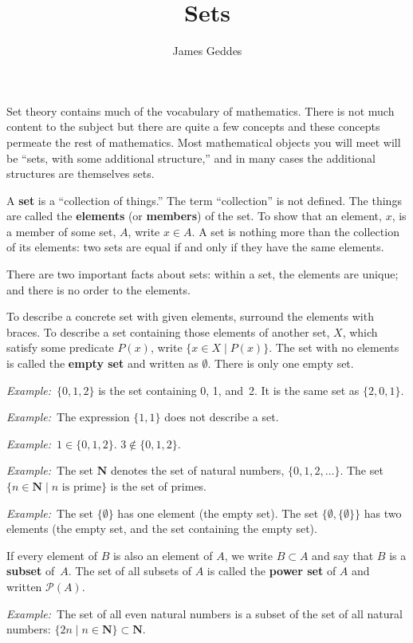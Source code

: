 \documentclass[12pt, a4paper]{article}
\title{\vspace{-6ex}Sets}
\author{James Geddes}
\newcommand{\defn}[1]{\textbf{#1}}
\newcommand{\set}[1]{\mathbold{#1}}
\newcommand{\eg}{\emph{Example:}\relax}
\begin{document}
\maketitle

Set theory contains much of the vocabulary of mathematics. There is
not much content to the subject but there are quite a few concepts and
these concepts permeate the rest of mathematics. Most mathematical
objects you will meet will be “sets, with some additional structure,”
and in many cases the additional structures are themselves sets.

A \defn{set} is a “collection of things.” The term “collection” is not
defined. The things are called the \defn{elements} (or \defn{members})
of the set. To show that an element, $x$, is a member of some set,
$A$, write $x \in A$. A set is nothing more than the collection of its
elements: two sets are equal if and only if they have the same elements.

There are two important facts about sets: within a set, the elements
are unique; and there is no order to the elements.

To describe a concrete set with given elements, surround the elements
with braces. To describe a set containing those elements of another
set, $X$, which satisfy some predicate $P(x)$, write $\{x \in X \mid
P(x)\}$. The set with no elements is called the \defn{empty set} and
written as $\emptyset$. There is only one empty set.

\eg\ $\{0, 1, 2\}$ is the set containing 0, 1, and~2. It is the same
set as $\{2,0,1\}$.

\eg\ The expression $\{1, 1\}$ does not describe a set.

\eg\ $1\in\{0,1,2\}$. $3\notin\{0,1,2\}$.

\eg\ The set $\set{N}$ denotes the set of natural numbers,
$\{0,1,2,\dotsc\}$. The set $\{n \in \set{N} \mid \text{$n$ is prime}\}$ is
the set of primes.

\eg\ The set $\{\emptyset\}$ has one element (the empty set). The set $\{\emptyset,
\{\emptyset\}\}$ has two elements (the empty set, and the set containing the
empty set).

If every element of $B$ is also an element of $A$, we write $B \subset A$
and say that $B$ is a \defn{subset} of~$A$. The set of all subsets of
$A$ is called the \defn{power set} of $A$ and written $\mathcal{P}(A)$.

\eg\ The set of all even natural numbers is a subset of the set of all
natural numbers: $\{2n \mid n \in \set{N}\} \subset \set{N}$.
\end{document}
